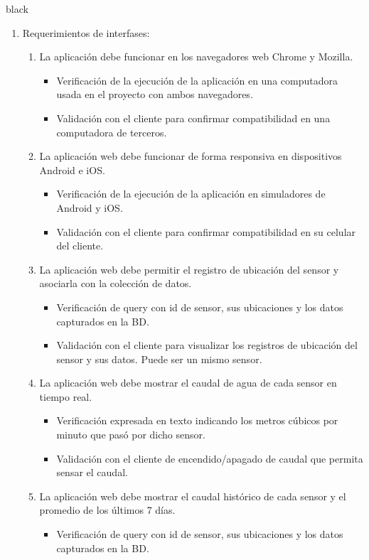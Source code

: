 \documentclass[
11pt, %
codirector, %
]{charter}
\begin{document}
\begin{consigna}{black}
\begin{enumerate}
\item Requerimientos de interfases:
	\begin{enumerate}
		\item La aplicación debe funcionar en los navegadores web Chrome y Mozilla.
			\begin{itemize}
				\item Verificación de la ejecución de la aplicación en una computadora usada en el proyecto con ambos navegadores.
				\item Validación con el cliente para confirmar compatibilidad en una computadora de terceros. 
			\end{itemize}
		\item La aplicación web debe funcionar de forma responsiva en dispositivos Android e iOS.
			\begin{itemize}
				\item Verificación de la ejecución de la aplicación en simuladores de Android y iOS.
				\item Validación con el cliente para confirmar compatibilidad en su celular del cliente. 
			\end{itemize}
		\item La aplicación web debe permitir el registro de ubicación del sensor y asociarla con la colección de datos.
			\begin{itemize}
				\item Verificación de query con id de sensor, sus ubicaciones y los datos capturados en la BD.
				\item Validación con el cliente para visualizar los registros de ubicación del sensor y sus datos. Puede ser un mismo sensor.
			\end{itemize}
		\item La aplicación web debe mostrar el caudal de agua de cada sensor en tiempo real. 
			\begin{itemize}
				\item Verificación expresada en texto indicando los metros cúbicos por minuto que pasó por dicho sensor.
				\item Validación con el cliente de encendido/apagado de caudal que permita sensar el caudal.  
			\end{itemize}
		\item La aplicación web debe mostrar el caudal histórico de cada sensor y el promedio de los últimos 7 días.
			\begin{itemize}
				\item Verificación de query con id de sensor, sus ubicaciones y los datos capturados en la BD.

\end{itemize}
\end{enumerate}
\end{enumerate}
\end{consigna}
\end{document}
